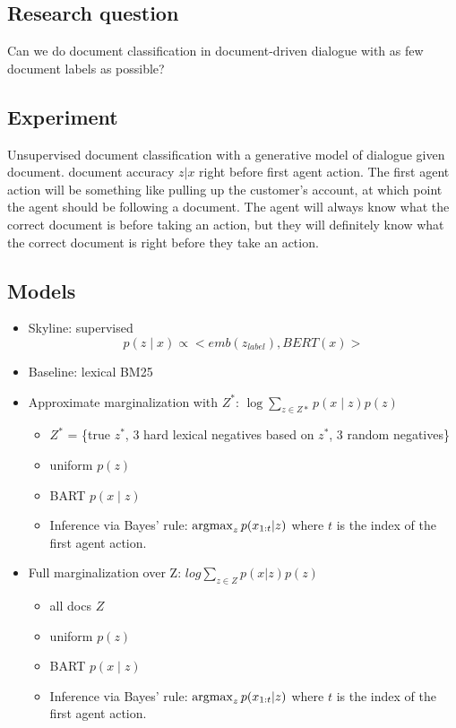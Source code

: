 \documentclass[11pt]{article}
\begin{document}
\subsection{Research question}
Can we do document classification in document-driven dialogue with as few document labels as possible?

\subsection{Experiment}
Unsupervised document classification with a generative model of dialogue given document.
document accuracy $z|x$ right before first agent action.
The first agent action will be something like pulling up the customer's account,
at which point the agent should be following a document.
The agent will always know what the correct document is before taking an action,
but they will definitely know what the correct document is right before they take an action.

\subsection{Models}
\begin{itemize}
\item Skyline: supervised $$p(z \mid x) \propto <emb(z_{label}), BERT(x)>$$
\item Baseline: lexical BM25
\item Approximate marginalization with $Z^*$: $\log\sum_{z\in Z*} p(x\mid z) p(z)$
    \begin{itemize}
    \item $Z^*$ = \{true $z^*$, 3 hard lexical negatives based on $z^*$, 3 random negatives\}
    \item uniform $p(z)$
    \item BART $p(x \mid z)$
    \item Inference via Bayes' rule: $\operatorname*{argmax}_z p(x_{1:t}|z)$ where $t$ is the index
        of the first agent action.
    \end{itemize}
\item Full marginalization over Z: $log\sum_{z\in Z} p(x|z)p(z)$
    \begin{itemize}
    \item all docs $Z$
    \item uniform $p(z)$
    \item BART $p(x \mid z)$
    \item Inference via Bayes' rule: $\operatorname*{argmax}_z p(x_{1:t}|z)$ where $t$ is the index
        of the first agent action.
    \end{itemize}
\end{itemize}
\end{document}

